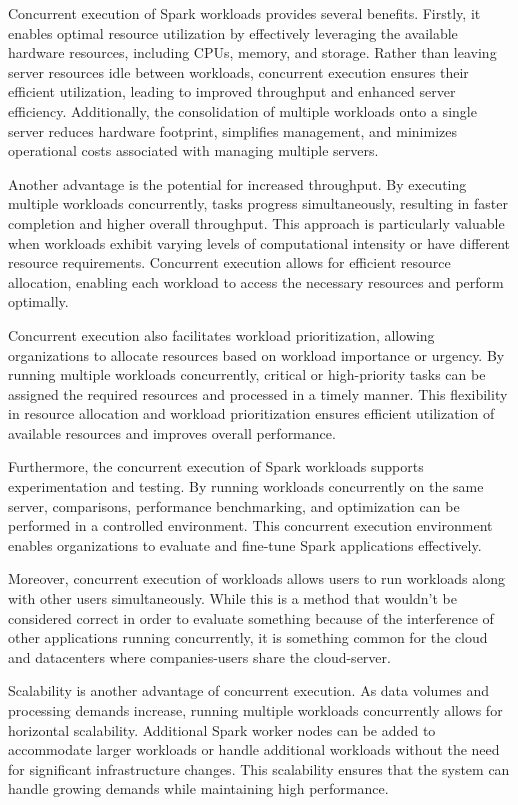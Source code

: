 Concurrent execution of Spark workloads provides several benefits.
Firstly, it enables optimal resource utilization by effectively
leveraging the available hardware resources, including CPUs, memory,
and storage. Rather than leaving server resources idle between
workloads, concurrent execution ensures their efficient utilization,
leading to improved throughput and enhanced server efficiency.
Additionally, the consolidation of multiple workloads onto a single
server reduces hardware footprint, simplifies management, and
minimizes operational costs associated with managing multiple servers.

Another advantage is the potential for increased throughput. By
executing multiple workloads concurrently, tasks progress
simultaneously, resulting in faster completion and higher overall
throughput. This approach is particularly valuable when workloads
exhibit varying levels of computational intensity or have different
resource requirements. Concurrent execution allows for efficient
resource allocation, enabling each workload to access the necessary
resources and perform optimally.

Concurrent execution also facilitates workload prioritization,
allowing organizations to allocate resources based on workload
importance or urgency. By running multiple workloads concurrently,
critical or high-priority tasks can be assigned the required resources
and processed in a timely manner. This flexibility in resource
allocation and workload prioritization ensures efficient utilization
of available resources and improves overall performance.

Furthermore, the concurrent execution of Spark workloads supports
experimentation and testing. By running workloads concurrently on the
same server, comparisons, performance benchmarking, and optimization
can be performed in a controlled environment. This concurrent
execution environment enables organizations to evaluate and fine-tune
Spark applications effectively.

Moreover, concurrent execution of workloads allows users to run
workloads along with other users simultaneously. While this is a
method that wouldn't be considered correct in order to evaluate
something because of the interference of other applications running
concurrently, it is something common for the cloud and datacenters
where companies-users share the cloud-server.

Scalability is another advantage of concurrent execution. As data
volumes and processing demands increase, running multiple workloads
concurrently allows for horizontal scalability. Additional Spark
worker nodes can be added to accommodate larger workloads or handle
additional workloads without the need for significant infrastructure
changes. This scalability ensures that the system can handle growing
demands while maintaining high performance.

